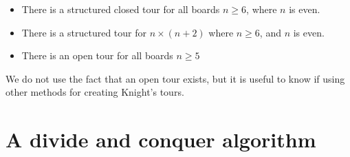\documentclass[11pt, a4paper]{article}
\begin{document}
\begin{itemize}
\item There is a structured closed tour for all boards $n \ge 6$, where $n$ is even.
\item There is a structured tour for $n \times (n + 2)$ where $n \ge 6$, and $n$ is even.
\item There is an open tour for all boards $n \ge 5$
\end{itemize}

We do not use the fact that an open tour exists, but it is useful to know if using other methods for creating Knight's tours.

\section{A divide and conquer algorithm}
\end{document}
